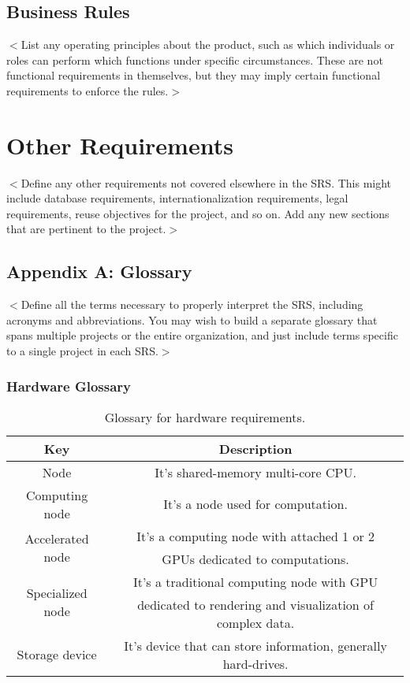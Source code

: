 \documentclass{report}
\begin{document}
\section{Business Rules}
$<$List any operating principles about the product, such as which individuals or 
roles can perform which functions under specific circumstances. These are not 
functional requirements in themselves, but they may imply certain functional 
requirements to enforce the rules.$>$


\chapter{Other Requirements}
$<$Define any other requirements not covered elsewhere in the SRS. This might 
include database requirements, internationalization requirements, legal 
requirements, reuse objectives for the project, and so on. Add any new sections 
that are pertinent to the project.$>$

\section{Appendix A: Glossary}
$<$Define all the terms necessary to properly interpret the SRS, including 
acronyms and abbreviations. You may wish to build a separate glossary that spans 
multiple projects or the entire organization, and just include terms specific to 
a single project in each SRS.$>$

\subsection{Hardware Glossary} \label{app:glossary:hardware}
	\begin{table}[!htbp]
		\centering
		\caption{Glossary for hardware requirements.}
		\label{tab:hardware_requirements_glossary}
		\begin{tabular}{|c|c|}
			\hline
			\textbf{Key} & \textbf{Description} \\ \hline \hline
			Node & It's shared-memory multi-core CPU.\\ \hline
			Computing node & It's a node used for computation. \\ \hline
			\multirow{2}{*}{Accelerated node} &  It's a computing node with attached 1 or 2 \\ & GPUs dedicated to computations.\\ \hline
			\multirow{2}{*}{Specialized node} & It's a traditional computing node with GPU \\& dedicated to rendering and visualization of complex data. \\ \hline \hline
			Storage device & It's device that can store information, generally hard-drives. \\ \hline
		\end{tabular}
	\end{table}
\clearpage
\end{document}
